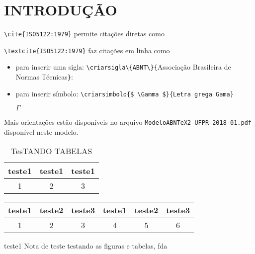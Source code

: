 \chapter[INTRODUÇÃO]{INTRODUÇÃO}


\verb|\cite{ISO5122:1979}| permite citações diretas como \cite{ISO5122:1979}

\verb|\textcite{ISO5122:1979}| faz citações em linha como \textcite{ISO5122:1979}

\begin{itemize}
 \item para inserir uma sigla: 
    \verb|\criarsigla\{ABNT\}{|Associa\c{c}\~ao Brasileira de Normas T\'ecnicas\verb|}|:


\item para inserir s\'imbolo: 
    \verb|\criarsimbolo{$ \Gamma $}{Letra grega Gama}|
  
    $ \Gamma $ 

\end{itemize}

Mais orientações estão disponíveis no arquivo \verb|ModeloABNTeX2-UFPR-2018-01.pdf| disponível neste modelo.

\begin{table}[!ht]
 \centering
 \par\caption{TesTANDO TABELAS}

\begin{tabular}{c|c|c}
 teste1&teste1&teste1\\\hline\hline
  1&2&3\\\hline
 \end{tabular}
 \label{tab:tab01}
\end{table}



{
\begin{tabular}{c|c|c|c|c|c}
 teste1&teste2&teste3&teste1&teste2&teste3\\\hline\hline
  1&2&3&4&5&6\\\hline
 \end{tabular}
} %
{teste1} %
{\textcite{ISO5122:1979}}%
{ Nota de teste } %
{testando as figuras e tabelas, fda} %


